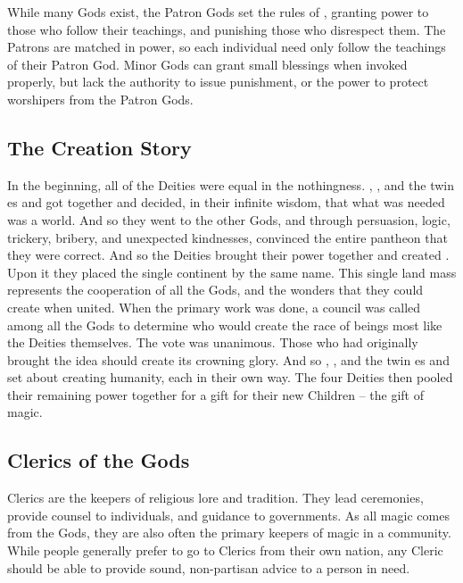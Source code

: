 \documentclass[blue]{GL2020}
\begin{document}
While many Gods exist, the Patron Gods set the rules of \pEarth{}, granting power to those who follow their teachings, and punishing those who disrespect them. The Patrons are matched in power, so each individual need only follow the teachings of their Patron God. Minor Gods can grant small blessings when invoked properly, but lack the authority to issue punishment, or the power to protect worshipers from the Patron Gods.

\subsection*{The Creation Story}
In the beginning, all of the Deities were equal in the nothingness. \cFarmGod{}, \cTechGod{}, and the twin \cEbb{\God}es \cEbb{} and \cFlow{} got together and decided, in their infinite wisdom, that what was needed was a world. And so they went to the other Gods, and through persuasion, logic, trickery, bribery, and unexpected kindnesses, convinced the entire pantheon that they were correct. And so the Deities brought their power together and created \pEarth{}. Upon it they placed the single continent by the same name. This single land mass represents the cooperation of all the Gods, and the wonders that they could create when united. When the primary work was done, a council was called among all the Gods to determine who would create the race of beings most like the Deities themselves. The vote was unanimous. Those who had originally brought the idea should create its crowning glory. And so \cFarmGod{}, \cTechGod{}, and the twin \cEbb{\God}es \cEbb{} and \cFlow{} set about creating humanity, each in their own way. The four Deities then pooled their remaining power together for a gift for their new Children -- the gift of magic.

\subsection*{Clerics of the Gods}
Clerics are the keepers of religious lore and tradition. They lead ceremonies, provide counsel to individuals, and guidance to governments. As all magic comes from the Gods, they are also often the primary keepers of magic in a community. While people generally prefer to go to Clerics from their own nation, any Cleric should be able to provide sound, non-partisan advice to a person in need.
\end{document}
